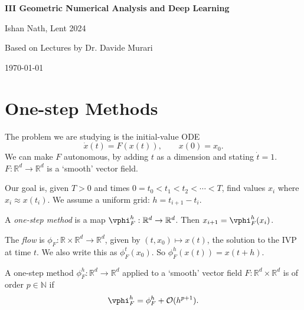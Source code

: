 \documentclass[12pt]{article}
\begin{document}
\hypersetup{pageanchor=false}
\begin{titlepage}
	\begin{center}
		\vspace*{1em}
		\Huge
		\textbf{III Geometric Numerical Analysis and Deep Learning}

		\vspace{1em}
		\large
		Ishan Nath, Lent 2024

		\vspace{1.5em}

		\Large

		Based on Lectures by Dr. Davide Murari

		\vspace{1em}

		\large
		\today
	\end{center}
	
\end{titlepage}
\hypersetup{pageanchor=true}

\tableofcontents

\newpage


\section{One-step Methods}%
\label{sub:o}

The problem we are studying is the initial-value ODE
\[
\dot x(t) = F(x(t)), \qquad x(0) = x_0.
\]
We can make $F$ autonomous, by adding $t$ as a dimension and stating $\dot t = 1$. $F : \mathbb{R}^{d} \to \mathbb{R}^{d}$ is a `smooth' vector field.

Our goal is, given $T > 0$ and times $0 = t_0 < t_1 < t_2 < \cdots < T$, find values $x_i$ where $x_i \approx x(t_i)$. We assume a uniform grid: $h = t_{i+1} - t_i$.

A \emph{one-step method} is a map $\vphi_{F}^{h} : \mathbb{R}^{d} \to \mathbb{R}^{d}$. Then $x_{i+1} = \vphi_{F}^{h}(x_i)$.

The \emph{flow} is $\phi_F : \mathbb{R} \times \mathbb{R}^{d} \to \mathbb{R}^d$, given by $(t, x_0) \mapsto x(t)$, the solution to the IVP at time $t$. We also write this as $\phi_F^t(x_0)$. So $\phi_F^h(x(t)) = x(t + h)$.

\begin{definition}
	A one-step method $\phi_F^h : \mathbb{R}^{d} \to \mathbb{R}^{d}$ applied to a `smooth' vector field $F : \mathbb{R}^{d} \times \mathbb{R}^{d}$ is of order $p \in \mathbb{N}$ if
	\[
	\vphi_F^h = \phi_F^h + \mathcal{O}(h^{p+1}).
	\]
\end{definition}
\end{document}
